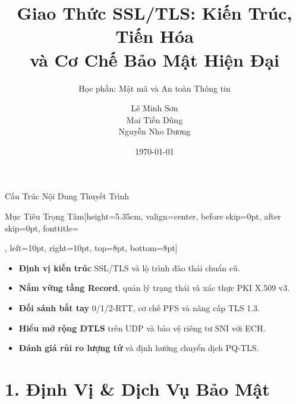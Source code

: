 \documentclass[aspectratio=169, 10pt]{beamer}
\title[Kiến trúc \& Bảo mật SSL/TLS]{Giao Thức SSL/TLS: Kiến Trúc, Tiến Hóa\\và Cơ Chế Bảo Mật Hiện Đại}
\subtitle{Học phần: Mật mã và An toàn Thông tin}
\author[Lê Minh Sơn, Mai Tiến Dũng, Nguyễn Nho Dương]{%
	Lê Minh Sơn \\
	Mai Tiến Dũng \\
	Nguyễn Nho Dương%
}
\date{\today}
\begin{document}
\begin{frame}[plain]
	\titlepage
\end{frame}

\begin{frame}{Cấu Trúc Nội Dung Thuyết Trình}
	\begin{accentcard}[uetblue]{Mục Tiêu Trọng Tâm}[height=5.35cm, valign=center, before skip=0pt, after skip=0pt, fonttitle=\fontsize{10.5pt}{12.5pt}\bfseries\raggedright, left=10pt, right=10pt, top=8pt, bottom=8pt]
		\raggedright
		\setlength{\leftmargini}{16pt}
		\begin{itemize}\setlength{\itemsep}{11pt}\setlength{\topsep}{0pt}\setlength{\parsep}{0pt}\fontsize{9.6pt}{13.5pt}\selectfont
			\item \textbf{Định vị kiến trúc} SSL/TLS và lộ trình đào thải chuẩn cũ.
			\item \textbf{Nắm vững tầng Record}, quản lý trạng thái và xác thực PKI X.509 v3.
			\item \textbf{Đối sánh bắt tay} 0/1/2-RTT, cơ chế PFS và nâng cấp TLS 1.3.
			\item \textbf{Hiểu mở rộng DTLS} trên UDP và bảo vệ riêng tư SNI với ECH.
			\item \textbf{Đánh giá rủi ro lượng tử} và định hướng chuyển dịch PQ-TLS.
		\end{itemize}
	\end{accentcard}
\end{frame}

\section{1. Định Vị \& Dịch Vụ Bảo Mật}
\end{document}
